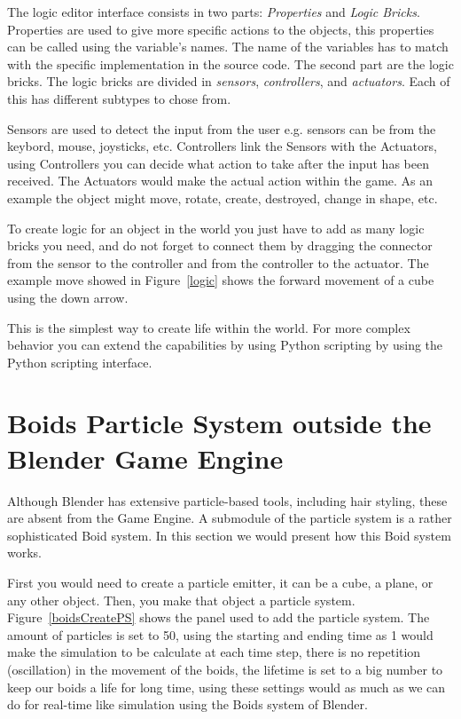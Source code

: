 The logic editor interface consists in two parts: \textit{Properties} and \textit{Logic Bricks}. Properties are used to give more specific actions to the objects, this properties can be called using the variable's names. The name of the variables has to match with the specific implementation in the source code. The second part are the logic bricks. The logic bricks are divided in \textit{sensors}, \textit{controllers}, and \textit{actuators}. Each of this has different subtypes to chose from.

Sensors are used to detect the input from the user e.g. sensors can be from the keybord, mouse, joysticks, etc. Controllers link the Sensors with the Actuators, using Controllers you can decide what action to take after the input has been received. The Actuators would make the actual action within the game. As an example the object might move, rotate, create, destroyed, change in shape, etc.

To create logic for an object in the world you just have to add as many logic bricks you need, and do not forget to connect them by dragging the connector from the sensor to the controller and from the controller to the actuator. The example move showed in Figure~\ref{logic} shows the forward movement of a cube using the down arrow.

This is the simplest way to create life within the world. For more complex behavior you can extend the capabilities by using Python scripting by using the Python scripting interface.

\section{Boids Particle System outside the Blender Game Engine}
Although Blender has extensive particle-based tools, including hair styling, these are absent from the Game Engine. A submodule of the particle system is a rather sophisticated Boid system. In this section we would present how this Boid system works.

First you would need to create a particle emitter, it can be a cube, a plane, or any other object. Then, you make that object a particle system. Figure~\ref{boidsCreatePS} shows the panel used to add the particle system. The amount of particles is set to 50, using the starting and ending time as 1 would make the simulation to be calculate at each time step, there is no repetition (oscillation) in the movement of the boids, the lifetime is set to a big number to keep our boids a life for long time, using these settings would as much as we can do for real-time like simulation using the Boids system of Blender.

